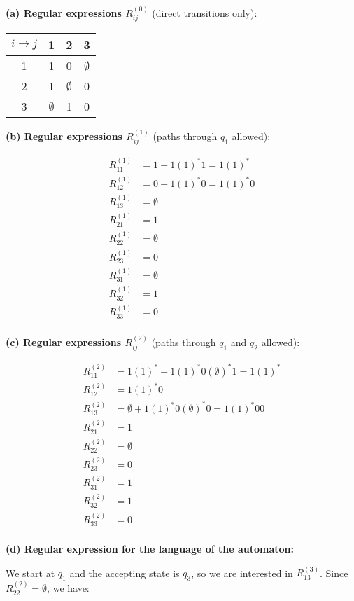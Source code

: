 \documentclass{article}
\theoremstyle{theorem}
\theoremstyle{definition}
\theoremstyle{remark}
\begin{document}
\textbf{(a) Regular expressions $R_{ij}^{(0)}$} (direct transitions only):

\begin{center}
\begin{tabular}{c|ccc}
$i \rightarrow j$ & 1 & 2 & 3 \\
\hline
1 & 1 & 0 & $\emptyset$ \\
2 & 1 & $\emptyset$ & 0 \\
3 & $\emptyset$ & 1 & 0 \\
\end{tabular}
\end{center}

\textbf{(b) Regular expressions $R_{ij}^{(1)}$} (paths through $q_1$ allowed):

\[
\begin{aligned}
R_{11}^{(1)} &= 1 + 1(1)^*1 = 1(1)^* \\
R_{12}^{(1)} &= 0 + 1(1)^*0 = 1(1)^*0 \\
R_{13}^{(1)} &= \emptyset \\
R_{21}^{(1)} &= 1 \\
R_{22}^{(1)} &= \emptyset \\
R_{23}^{(1)} &= 0 \\
R_{31}^{(1)} &= \emptyset \\
R_{32}^{(1)} &= 1 \\
R_{33}^{(1)} &= 0 \\
\end{aligned}
\]

\textbf{(c) Regular expressions $R_{ij}^{(2)}$} (paths through $q_1$ and $q_2$ allowed):

\[
\begin{aligned}
R_{11}^{(2)} &= 1(1)^* + 1(1)^*0 (\emptyset)^* 1 = 1(1)^* \\
R_{12}^{(2)} &= 1(1)^*0 \\
R_{13}^{(2)} &= \emptyset + 1(1)^*0 (\emptyset)^* 0 = 1(1)^*00 \\
R_{21}^{(2)} &= 1 \\
R_{22}^{(2)} &= \emptyset \\
R_{23}^{(2)} &= 0 \\
R_{31}^{(2)} &= 1 \\
R_{32}^{(2)} &= 1 \\
R_{33}^{(2)} &= 0 \\
\end{aligned}
\]

\textbf{(d) Regular expression for the language of the automaton:}

We start at $q_1$ and the accepting state is $q_3$, so we are interested in $R_{13}^{(3)}$. Since $R_{22}^{(2)} = \emptyset$, we have:
\end{document}
